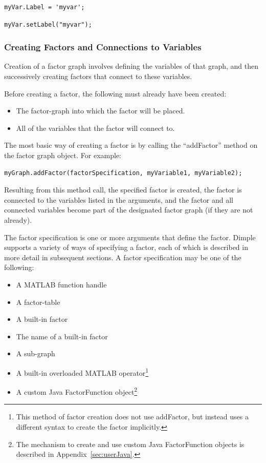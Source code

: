\ifmatlab
\begin{lstlisting}
myVar.Label = 'myvar';
\end{lstlisting}
\fi

\ifjava
\begin{lstlisting}
myVar.setLabel("myvar");
\end{lstlisting}
\fi

\subsubsection{Creating Factors and Connections to Variables}
\label{sec:CreatingFactors}


Creation of a factor graph involves defining the variables of that graph, and then successively creating factors that connect to these variables.

Before creating a factor, the following must already have been created:
\begin{itemize}
\item The factor-graph into which the factor will be placed.
\item All of the variables that the factor will connect to.
\end{itemize}

The most basic way of creating a factor is by calling the ``addFactor'' method on the factor graph object.  For example:

\begin{lstlisting}
myGraph.addFactor(factorSpecification, myVariable1, myVariable2);
\end{lstlisting}

Resulting from this method call, the specified factor is created, the factor is connected to the variables listed in the arguments, and the factor and all connected variables become part of the designated factor graph (if they are not already).

The factor specification is one or more arguments that define the factor.  Dimple supports a variety of ways of specifying a factor, each of which is described in more detail in subsequent sections.  A factor specification may be one of the following:

\ifmatlab

\begin{itemize}
\item A MATLAB function handle
\item A factor-table
\item A built-in factor
\item The name of a built-in factor
\item A sub-graph
\item A built-in overloaded MATLAB operator\footnote{This method of factor creation does not use addFactor, but instead uses a different syntax to create the factor implicitly.}
\item A custom Java FactorFunction object\footnote{The mechanism to create and use custom Java FactorFunction objects is described in Appendix~\ref{sec:userJava}.}
\end{itemize}

